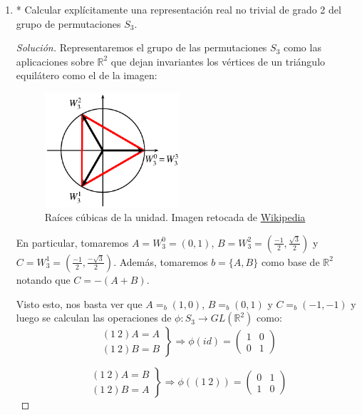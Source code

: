 \documentclass[paper=a4, fontsize=11pt, spanish]{scrartcl}
\begin{document}
\begin{enumerate}
		\item * Calcular explícitamente una representación real no trivial de grado 2 del grupo de permutaciones
		$S_3$.
		\begin{proof}[Solución]
			Representaremos el grupo de las permutaciones $S_3$ como las aplicaciones sobre $\mathbb{R}^2$ que
			dejan invariantes los vértices de un triángulo equilátero como el de la imagen:
			
			\begin{figure}[H]
				\centering
				\includegraphics[width=5cm]{./3rd-roots-of-unity.png}
				\caption{Raíces cúbicas de la unidad. Imagen retocada de
				\href{https://upload.wikimedia.org/wikipedia/commons/3/3a/3rd-roots-of-unity.png}{Wikipedia}}
			\end{figure}
			
			En particular, tomaremos $A = W_3^0 = (0, 1)$, $\displaystyle B = W_3^2 = \left(\frac{-1}{2},
			\frac{\sqrt{3}}{2}\right)$ y $\displaystyle C = W_3^1 = \left(\frac{-1}{2}, \frac{-\sqrt{3}}{2}\right)$.
			Además, tomaremos $b=\{A, B\}$ como base de $\mathbb{R}^2$ notando que $C = -(A+B)$.
			
			Visto esto, nos basta ver que $A =_b (1, 0)$, $B =_b (0, 1)$ y $C =_b (-1, -1)$ y luego se calculan
			las operaciones de $\phi: S_3 \rightarrow GL\left(\mathbb{R}^2\right)$ como:
			$$\left.\begin{aligned}
				(1\ 2)A = A\\
				(1\ 2)B = B
			\end{aligned}\right\} \Rightarrow\phi(id) = \begin{pmatrix} 1 & 0\\ 0 & 1 \end{pmatrix}$$
			
			$$\left.\begin{aligned}
				(1\ 2)A = B\\
				(1\ 2)B = A
			\end{aligned}\right\} \Rightarrow \phi((1\ 2)) = \begin{pmatrix} 0 & 1\\ 1 & 0 \end{pmatrix}$$
			

\end{proof}
\end{enumerate}
\end{document}
